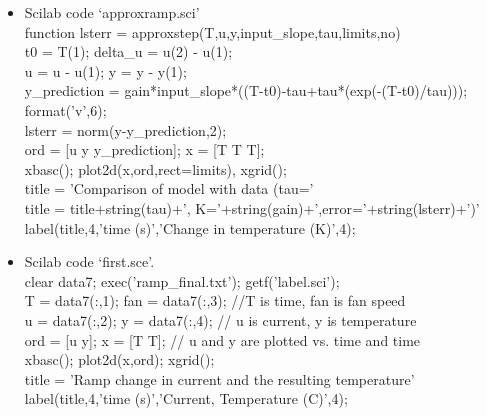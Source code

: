 \documentclass[12pt,prb]{article}
\begin{document}
\begin{itemize}
\item Scilab code \textquoteleft approx\textunderscore ramp.sci\textquoteright
\vspace{0.5cm}\\ \textrightarrow function lsterr = approx\textunderscore step(T,u,y,input\_slope,tau,limits,no)\\
\textrightarrow t0 = T(1); delta\_u = u(2) - u(1);\\
\textrightarrow u = u - u(1); y = y - y(1);\\
\textrightarrow y\_prediction = gain*input\_slope*((T-t0)-tau+tau*(exp(-(T-t0)/tau)));\\
\textrightarrow format('v',6);\\
\textrightarrow lsterr = norm(y-y\_prediction,2);\\
\textrightarrow ord = [u y y\_prediction]; x = [T T T];\\
\textrightarrow xbasc(); plot2d(x,ord,rect=limits), xgrid();\\
\textrightarrow title = 'Comparison of model with data (tau='\\
\textrightarrow title = title+string(tau)+', K='+string(gain)+',error='+string(lsterr)+')'\\
\textrightarrow label(title,4,'time (s)','Change in temperature (K)',4);\\


\item Scilab code \textquoteleft first.sce\textquoteright.
\vspace{0.5cm}\\ \textrightarrow clear data7; exec('ramp\_final.txt'); \textrightarrow getf('label.sci');\\
\textrightarrow T = data7(:,1); fan = data7(:,3); //T is time, fan is fan speed\\
\textrightarrow u = data7(:,2); y = data7(:,4); // u is current, y is temperature\\
\textrightarrow ord = [u y]; x = [T T]; // u and y are plotted vs. time and time\\
\textrightarrow xbasc(); plot2d(x,ord); xgrid();\\
\textrightarrow title = 'Ramp change in current and the resulting temperature'\\
\textrightarrow label(title,4,'time (s)','Current, Temperature (C)',4);\\
  



\end{itemize}
\end{document}
